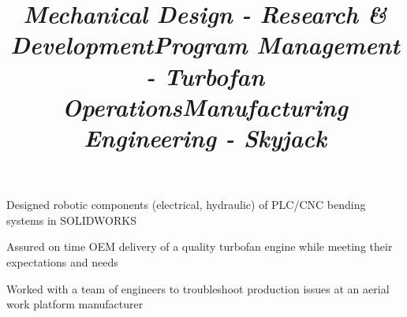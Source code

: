 \documentclass[mm]{res}
\begin{document}
\begin{resume}
\title{\textsl{Mechanical Design - Research \& Development}}
\begin{position}
\tb Designed robotic components (electrical, hydraulic) of PLC/CNC bending systems in SOLIDWORKS
\end{position}

\title{\textsl{Program Management - Turbofan Operations}}
\begin{position}
\tb Assured on time OEM delivery of a quality turbofan engine while meeting their expectations and needs
\end{position}

\title{\textsl{Manufacturing Engineering - Skyjack}}
\begin{position}
\tb Worked with a team of engineers to troubleshoot production issues at an aerial work platform manufacturer
\end{position}




\end{resume}
\end{document}
